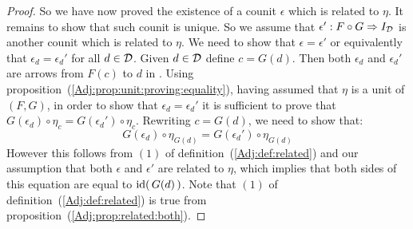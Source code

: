 \begin{proof}
    So we have now proved the existence of a counit $\epsilon$ which is
    related to $\eta$. It remains to show that such counit is unique.
    So we assume that $\epsilon':F\circ G\Rightarrow I_{\cal D}$ is 
    another counit which is related to $\eta$. We need to show that
    $\epsilon=\epsilon'$ or equivalently that $\epsilon_{d}=\epsilon_{d}'$
    for all $d\in\mbox{$\cal D$}$. Given $d\in\mbox{$\cal D$}$ define $c=G(d)$. Then both 
    $\epsilon_{d}$ and $\epsilon_{d}'$ are arrows from $F(c)$ to $d$ in
    \Dat. Using proposition~(\ref{Adj:prop:unit:proving:equality}), having
    assumed that $\eta$ is a unit of $(F,G)$, in order to show that 
    $\epsilon_{d}=\epsilon_{d}'$ it is sufficient to prove that
    $G(\epsilon_{d})\circ\eta_{c}=G(\epsilon_{d}')\circ\eta_{c}$. Rewriting
    $c=G(d)$, we need to show that:
        \[
            G(\epsilon_{d})\circ\eta_{G(d)}=G(\epsilon_{d}')\circ\eta_{G(d)}
        \]
    However this follows from $(1)$ of definition~(\ref{Adj:def:related}) and
    our assumption that both $\epsilon$ and $\epsilon'$ are related to $\eta$,
    which implies that both sides of this equation are equal to $\mbox{\rm id}(\,G(d)\,)$.
    Note that $(1)$ of definition~(\ref{Adj:def:related}) is true from
    proposition~(\ref{Adj:prop:related:both}).
\end{proof}

